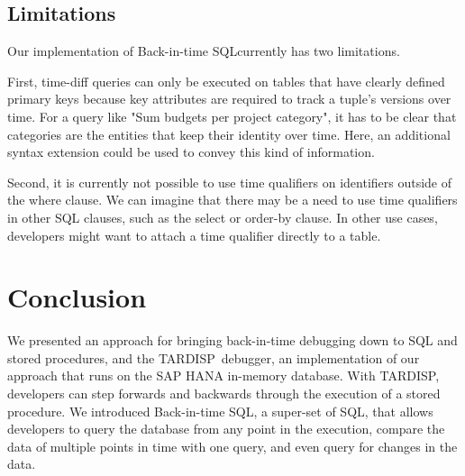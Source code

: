 \documentclass[english,conference]{IEEEtran}
\newcommand{\tool}{TAR\-DISP}
\newcommand{\SQLextension}{Back-in-time SQL}
\begin{document}

\subsection{Limitations}

Our implementation of \SQLextension currently has two limitations.

First, time-diff queries can only be executed on tables that have clearly defined primary keys because key attributes are required to track a tuple's versions over time.
For a query like "Sum budgets per project category", it has to be clear that categories are the entities that keep their identity over time.
Here, an additional syntax extension could be used to convey this kind of information.

Second, it is currently not possible to use time qualifiers on identifiers outside of the where clause.
We can imagine that there may be a need to use time qualifiers in other SQL clauses, such as the select or order-by clause.
In other use cases, developers might want to attach a time qualifier directly to a table.




\section{Conclusion}
\label{sec:conclusion}

We presented an approach for bringing back-in-time debugging down to SQL and stored procedures, and the \tool\ debugger, an implementation of our approach that runs on the SAP HANA in-memory database.
With \tool, developers can step forwards and backwards through the execution of a stored procedure.
We introduced \SQLextension, a super-set of SQL, that allows developers to query the database from any point in the execution, compare the data of multiple points in time with one query, and even query for changes in the data.
\end{document}
